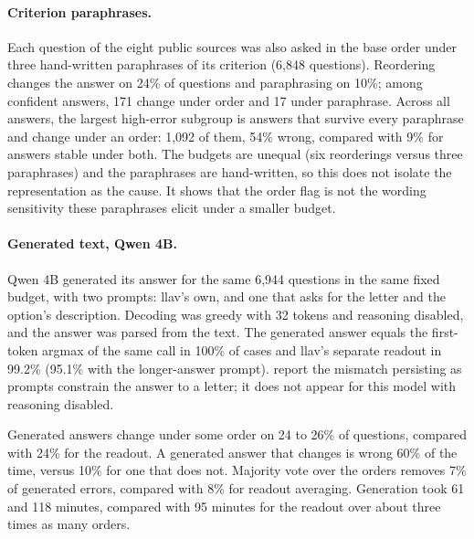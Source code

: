 \documentclass[10pt,twocolumn]{article}
\begin{document}
\begin{table}[t]
\centering\scriptsize\setlength{\tabcolsep}{3pt}

\caption{Per-source Mantel--Haenszel odds ratio for error among changing versus stable confident answers, stratified by confidence decile, with the number of confident flips in parentheses. $\dagger$: 95\% interval includes 1. A dash: fewer than ten flips or no estimable ratio.}
\label{tab:persource}
\end{table}

\paragraph{Criterion paraphrases.} Each question of the eight public sources was also asked in the base order under three hand-written paraphrases of its criterion (6,848 questions). Reordering changes the answer on 24\% of questions and paraphrasing on 10\%; among confident answers, 171 change under order and 17 under paraphrase. Across all answers, the largest high-error subgroup is answers that survive every paraphrase and change under an order: 1,092 of them, 54\% wrong, compared with 9\% for answers stable under both. The budgets are unequal (six reorderings versus three paraphrases) and the paraphrases are hand-written, so this does not isolate the representation as the cause. It shows that the order flag is not the wording sensitivity these paraphrases elicit under a smaller budget.

\paragraph{Generated text, Qwen 4B.} Qwen 4B generated its answer for the same 6,944 questions in the same fixed budget, with two prompts: llav's own, and one that asks for the letter and the option's description. Decoding was greedy with 32 tokens and reasoning disabled, and the answer was parsed from the text. The generated answer equals the first-token argmax of the same call in 100\% of cases and llav's separate readout in 99.2\% (95.1\% with the longer-answer prompt). \citet{wang2024myanswer} report the mismatch persisting as prompts constrain the answer to a letter; it does not appear for this model with reasoning disabled.

Generated answers change under some order on 24 to 26\% of questions, compared with 24\% for the readout. A generated answer that changes is wrong 60\% of the time, versus 10\% for one that does not. Majority vote over the orders removes 7\% of generated errors, compared with 8\% for readout averaging. Generation took 61 and 118 minutes, compared with 95 minutes for the readout over about three times as many orders.
\end{document}
